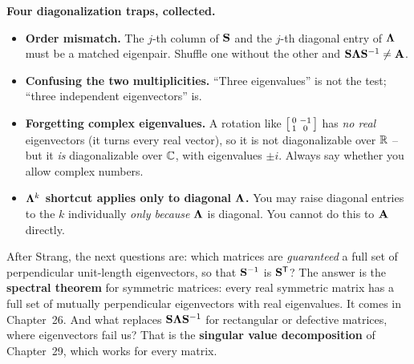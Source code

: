 \begin{trapbox}
\textbf{Four diagonalization traps, collected.}
\begin{itemize}
  \item \textbf{Order mismatch.} The $j$-th column of $\mathbf{S}$ and the $j$-th
        diagonal entry of $\mathbf{\Lambda}$ must be a matched eigenpair. Shuffle
        one without the other and $\mathbf{S}\mathbf{\Lambda}\mathbf{S}^{-1} \neq \mathbf{A}$.
  \item \textbf{Confusing the two multiplicities.} ``Three eigenvalues'' is not
        the test; ``three independent eigenvectors'' is.
  \item \textbf{Forgetting complex eigenvalues.} A rotation like
        $\begin{bsmallmatrix}0&-1\\1&0\end{bsmallmatrix}$ has \emph{no real}
        eigenvectors (it turns every real vector), so it is not diagonalizable
        over $\mathbb{R}$ -- but it \emph{is} diagonalizable over $\mathbb{C}$, with eigenvalues
        $\pm i$. Always say whether you allow complex numbers.
  \item \textbf{$\mathbf{\Lambda}^k$ shortcut applies only to diagonal
        $\mathbf{\Lambda}$.} You may raise diagonal entries to the $k$ individually
        \emph{only because} $\mathbf{\Lambda}$ is diagonal. You cannot do this to
        $\mathbf{A}$ directly.
\end{itemize}
\end{trapbox}

\begin{strangbox}
After Strang, the next questions are: which matrices are
\emph{guaranteed} a full set of perpendicular unit-length eigenvectors, so that
$\mathbf{S}^{-1}$ is $\mathbf{S}^{\mathsf{T}}$? The answer is the \textbf{spectral theorem} for
symmetric matrices: every real symmetric matrix has a full
set of mutually perpendicular eigenvectors with real eigenvalues. It comes
in Chapter~26. And what replaces
$\mathbf{S}\mathbf{\Lambda}\mathbf{S}^{-1}$ for rectangular or defective matrices, where
eigenvectors fail us? That is the \textbf{singular value decomposition}
of Chapter~29, which works for every matrix.
\end{strangbox}

